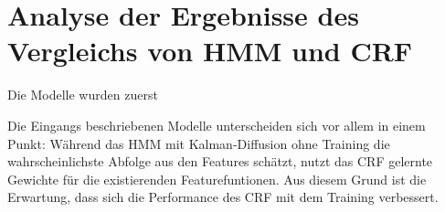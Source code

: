 \begin{table}[]
\centering
\caption{Präzision, Recall und F1 über alle Videos.}
\label{tab:vergleich_alle_videos}
\end{table}


\section{Analyse der Ergebnisse des Vergleichs von HMM und CRF}

Die Modelle wurden zuerst 

Die Eingangs beschriebenen Modelle unterscheiden sich vor allem in einem Punkt: Während das HMM mit Kalman-Diffusion ohne Training die wahrscheinlichste Abfolge aus den Features schätzt, nutzt das CRF gelernte Gewichte für die existierenden Featurefuntionen. Aus diesem Grund ist die Erwartung, dass sich die Performance des CRF mit dem Training verbessert.

